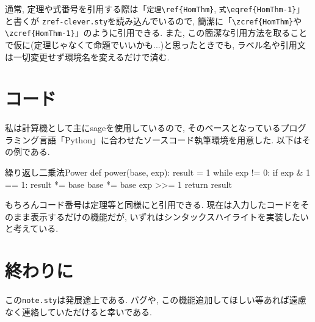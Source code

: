 \documentclass[
	paper=a4,
	fontsize=10pt, %
	jafontsize=12Q,
	jafontscale=0.92,
]{jlreq}
\begin{document}
通常, 定理や式番号を引用する際は「\verb|定理\ref{HomThm}|, \verb|式\eqref{HomThm-1}|」と書くが
\texttt{zref-clever.sty}を読み込んでいるので, 簡潔に「\verb|\zcref{HomThm}|や\verb|\zcref{HomThm-1}|」のように引用できる.
また, この簡潔な引用方法を取ることで仮に(定理じゃなくて命題でいいかも...)と思ったときでも, ラベル名や引用文は一切変更せず環境名を変えるだけで済む.

\section{コード}

私は計算機として主にsageを使用しているので, そのベースとなっているプログラミング言語「Python」に合わせたソースコード執筆環境を用意した.
以下はその例である.

\begin{pycode}{繰り返し二乗法}{Power}
def power(base, exp):
	result = 1
	while exp != 0:
		if exp & 1 == 1:
			result *= base
		base *= base
		exp >>= 1
	return result
\end{pycode}

もちろんコード番号は定理等と同様にと引用できる.
現在は入力したコードをそのまま表示するだけの機能だが, いずれはシンタックスハイライトを実装したいと考えている.

\section{終わりに}

この\texttt{note.sty}は発展途上である.
バグや, この機能追加してほしい等あれば遠慮なく連絡していただけると幸いである.
\\

\lipsum[2-5]



\newpage
\nocite{*}
\printbibliography[title=参考文献]
\end{document}
